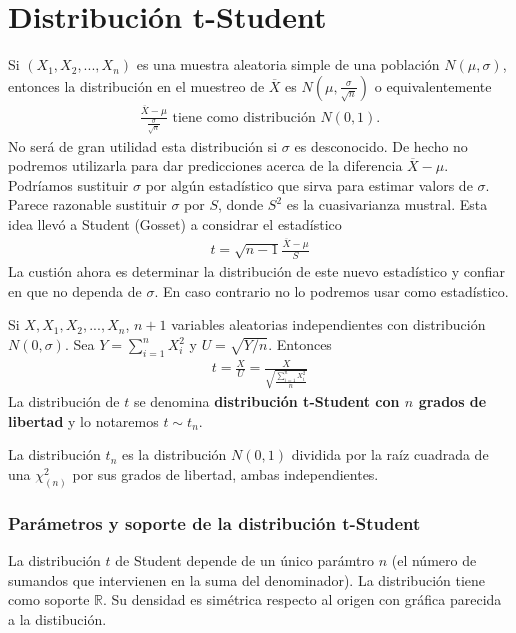 \section{Distribución t-Student}
Si $(X_1,X_2,...,X_n)$ es una muestra aleatoria simple de una población $N(\mu,\sigma)$, entonces la distribución en el muestreo de $\overline{X}$ es $N\left( \mu, \frac{\sigma}{\sqrt{n}} \right)$ o equivalentemente
\begin{align*}
    \frac{\overline{X} - \mu}{\frac{\sigma}{\sqrt{n}}} \text{ tiene como distribución } N(0,1).
\end{align*}
No será de gran utilidad esta distribución si $\sigma$ es desconocido. De hecho no podremos utilizarla para dar predicciones acerca de la diferencia $\overline{X} - \mu$. Podríamos sustituir $\sigma$ por algún estadístico que sirva para estimar valors de $\sigma$. Parece razonable sustituir $\sigma$ por $S$, donde $S^2$ es la cuasivarianza mustral. Esta idea llevó a Student (Gosset) a considrar el estadístico
\begin{align*}
    t = \sqrt{n -1}\frac{\overline{X} - \mu}{S}
\end{align*}
La custión ahora es determinar la distribución de este nuevo estadístico y confiar en que no dependa de $\sigma$. En caso contrario no lo podremos usar como estadístico.
\begin{defi}
Si $X,X_1,X_2,...,X_n$, $n +1$ variables aleatorias independientes con distribución $N(0,\sigma)$. Sea $Y = \sum_{i=1}^{n}{X_i^2}$ y $U = \sqrt{Y/n}$. Entonces
\begin{align*}
    t = \frac{X}{U} = \frac{X}{\sqrt{\frac{\sum_{i=1}^{n}{X_i^2}}{n}}}
\end{align*}
La distribución de $t$ se denomina \textbf{distribución t-Student con $n$ grados de libertad} y lo notaremos $t \sim t_n$.
\end{defi}
La distribución $t_n$ es la distribución $N(0,1)$ dividida por la raíz cuadrada de una $\chi_{(n)}^2$ por sus grados de libertad, ambas independientes.

\subsubsection{Parámetros y soporte de la distribución t-Student}
La distribución $t$ de Student depende de un único parámtro $n$ (el número de sumandos que intervienen en la suma del denominador). La distribución tiene como soporte $\mathbb{R}$. Su densidad es simétrica respecto al origen con gráfica parecida a la distibución.

